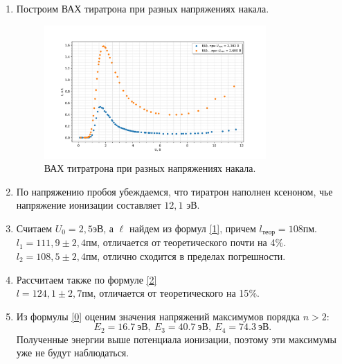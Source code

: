 \documentclass[a4paper]{article}
\begin{document}
\begin{enumerate}
  \item Построим ВАХ тиратрона при разных напряжениях накала.
  \begin{figure}[h]
    \includegraphics[width=0.8\textwidth]{I(U).png}
    \centering
    \caption{ВАХ титратрона при разных напряжениях накала.}
    \end{figure}
    \item По напряжению пробоя убеждаемся, что тиратрон наполнен ксеноном, чье напряжение ионизации составляет $12,1$ эВ.
    \item Считаем $U_0 = 2,5 эВ$, а $\ell$ найдем из формул \eqref{1}, причем $l_{теор} = 108$пм. \\
    $l_1 = 111,9 \pm 2,4$пм, отличается от теоретического почти на 4$\%$. \\
    $l_2 = 108,5 \pm 2,4$пм, отлично сходится в пределах погрешности. \\

    \item Рассчитаем также по формуле \eqref{2} \\
    $ l = 124,1 \pm 2,7$пм, отличается от теоретического на 15$\%$.
    \item Из формулы \eqref{0} оценим значения напряжений максимумов порядка $n > 2$:
    \[E_2= 16.7~\text{эВ},~E_3 = 40.7~\text{эВ},~E_4 = 74.3~\text{эВ}.\]
    Полученные энергии выше потенциала ионизации, поэтому эти максимумы уже не будут наблюдаться.
    

\end{enumerate}
\end{document}
